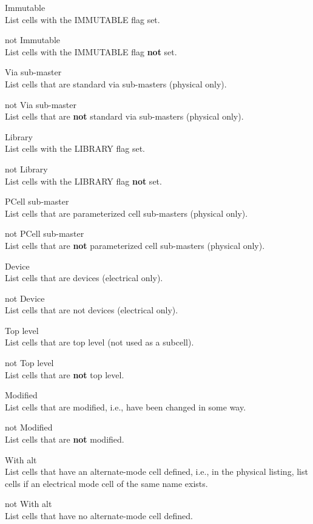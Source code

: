 \begin{description}
\item{\cb Immutable}\\
List cells with the IMMUTABLE flag set.
\item{\cb not Immutable}\\
List cells with the IMMUTABLE flag {\bf not} set.

\item{\cb Via sub-master}\\
List cells that are standard via sub-masters (physical only).
\item{\cb not Via sub-master}\\
List cells that are {\bf not} standard via sub-masters (physical only).

\item{\cb Library}\\
List cells with the LIBRARY flag set.
\item{\cb not Library}\\
List cells with the LIBRARY flag {\bf not} set.

\item{\cb PCell sub-master}\\
List cells that are parameterized cell sub-masters (physical only).
\item{\cb not PCell sub-master}\\
List cells that are {\bf not} parameterized cell sub-masters (physical
only).

\item{\cb Device}\\
List cells that are devices (electrical only).
\item{\cb not Device}\\
List cells that are {\cb not} devices (electrical only).

\item{\cb Top level}\\
List cells that are top level (not used as a subcell).
\item{\cb not Top level}\\
List cells that are {\bf not} top level.

\item{\cb Modified}\\
List cells that are modified, i.e., have been changed in some way.
\item{\cb not Modified}\\
List cells that are {\bf not} modified.

\item{\cb With alt}\\
List cells that have an alternate-mode cell defined, i.e., in the
physical listing, list cells if an electrical mode cell of the
same name exists.
\item{\cb not With alt}\\
List cells that have no alternate-mode cell defined.


\end{description}
